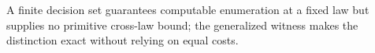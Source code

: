 A finite decision set guarantees computable enumeration at a fixed law but supplies no primitive cross-law bound; the generalized witness makes the distinction exact without relying on equal costs.